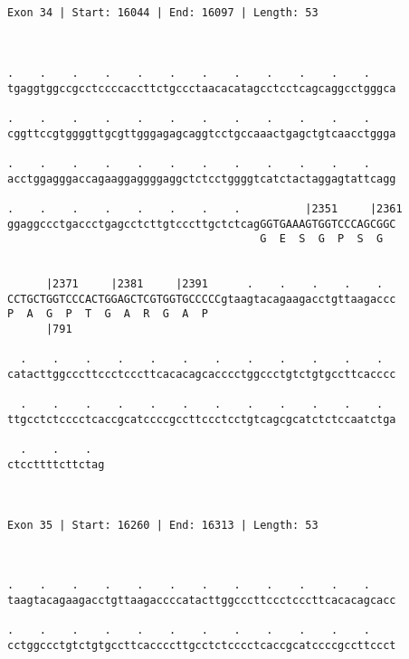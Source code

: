\documentclass{article}
\begin{document}
\begin{Verbatim}
                            
 
Exon 34 | Start: 16044 | End: 16097 | Length: 53



.    .    .    .    .    .    .    .    .    .    .    .    
tgaggtggccgcctccccaccttctgccctaacacatagcctcctcagcaggcctgggca
                                                            
.    .    .    .    .    .    .    .    .    .    .    .    
cggttccgtggggttgcgttgggagagcaggtcctgccaaactgagctgtcaacctggga
                                                            
.    .    .    .    .    .    .    .    .    .    .    .    
acctggagggaccagaaggaggggaggctctcctggggtcatctactaggagtattcagg
                                                            
.    .    .    .    .    .    .    .          |2351     |2361
ggaggccctgaccctgagcctcttgtcccttgctctcagGGTGAAAGTGGTCCCAGCGGC
                                       G  E  S  G  P  S  G  
                                                            
  
      |2371     |2381     |2391      .    .    .    .    .  
CCTGCTGGTCCCACTGGAGCTCGTGGTGCCCCCgtaagtacagaagacctgttaagaccc
P  A  G  P  T  G  A  R  G  A  P                             
      |791                                                  
  
  .    .    .    .    .    .    .    .    .    .    .    .  
catacttggcccttccctcccttcacacagcacccctggccctgtctgtgccttcacccc
                                                            
  .    .    .    .    .    .    .    .    .    .    .    .  
ttgcctctcccctcaccgcatccccgccttccctcctgtcagcgcatctctccaatctga
                                                            
  .    .    .  
ctccttttcttctag
               
               
 
Exon 35 | Start: 16260 | End: 16313 | Length: 53



.    .    .    .    .    .    .    .    .    .    .    .    
taagtacagaagacctgttaagaccccatacttggcccttccctcccttcacacagcacc
                                                            
.    .    .    .    .    .    .    .    .    .    .    .    
cctggccctgtctgtgccttcaccccttgcctctcccctcaccgcatccccgccttccct
                                                            

\end{Verbatim}
\end{document}
